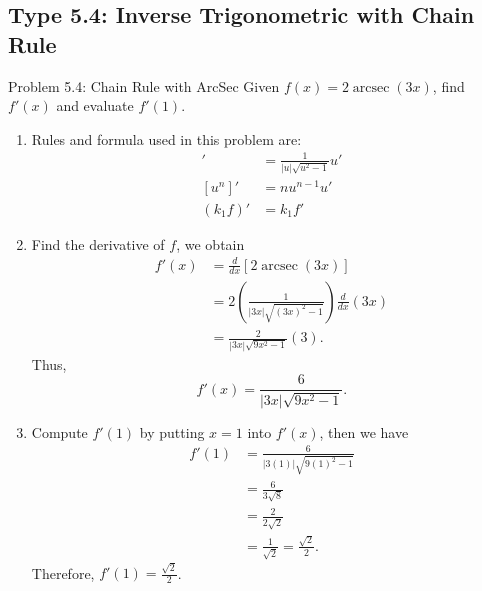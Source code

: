 \documentclass[11pt,a4paper]{article}
\begin{document}
\subsection{Type 5.4: Inverse Trigonometric with Chain Rule}
\begin{problembox}{Problem 5.4: Chain Rule with ArcSec}
Given $f(x) = 2\operatorname{arcsec}(3x)$, find $f'(x)$ and evaluate $f'(1)$.
\end{problembox}
\begin{solutionbox}
\begin{enumerate}
	\item [Step 1.] Rules and formula used in this problem are:
	\begin{align*}
		[\operatorname{arcsec}(u)]' &= \frac{1}{|u|\sqrt{u^2-1}} u' \\
		[u^n]' &= n u^{n-1} u' \\
		(k_1f)' &= k_1f'
	\end{align*}
	
	\item [Step 2.] Find the derivative of $f$, we obtain
	\begin{align*}
		f'(x) &= \frac{d}{dx} \left[ 2\operatorname{arcsec}(3x) \right] \\
		&= 2 \left( \frac{1}{|3x|\sqrt{(3x)^2-1}} \right) \frac{d}{dx} (3x) \\
		&= \frac{2}{|3x|\sqrt{9x^2-1}} (3).
	\end{align*}
	Thus,
	\begin{equation*}
		f'(x) = \frac{6}{|3x|\sqrt{9x^2-1}}.
	\end{equation*}
	
	\item [Step 3.] Compute $f'(1)$ by putting $x = 1$ into $f'(x)$, then we have
	\begin{align*}
		f'(1) &= \frac{6}{|3(1)|\sqrt{9(1)^2-1}} \\
		&= \frac{6}{3\sqrt{8}} \\
		&= \frac{2}{2\sqrt{2}} \\
		&= \frac{1}{\sqrt{2}} = \frac{\sqrt{2}}{2}.
	\end{align*}
	Therefore, $f'(1) = \frac{\sqrt{2}}{2}$.
\end{enumerate}
\end{solutionbox}
\end{document}
